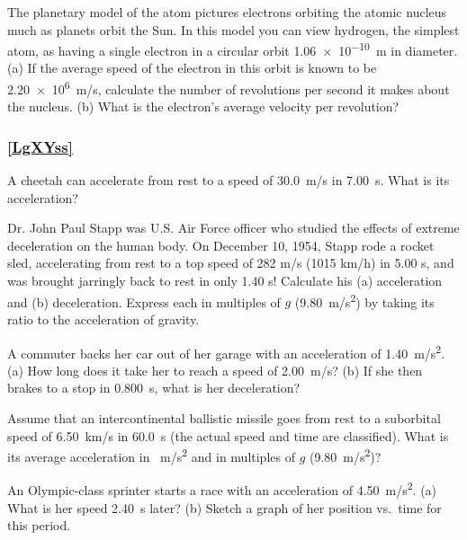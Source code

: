 \documentclass[../../main-ap-physics.tex]{subfiles}
\begin{document}
\begin{exercise}
    The planetary model of the atom pictures electrons orbiting the atomic nucleus much as planets orbit the Sun. In this model you can view hydrogen, the simplest atom, as having a single electron in a circular orbit \SI{1.06e-10}{m} in diameter. (a) If the average speed of the electron in this orbit is known to be \SI{2.20e6}{m/s}, calculate the number of revolutions per second it makes about the nucleus. (b) What is the electron's average velocity per revolution?
\end{exercise}

\subsubsection*{\ref{LgXYss} }

\begin{exercise}
    A cheetah can accelerate from rest to a speed of \SI{30.0}{m/s} in \SI{7.00}{s}. What is its acceleration?
\end{exercise}

\begin{exercise}
Dr. John Paul Stapp was U.S. Air Force officer who studied the effects of extreme deceleration on the human body. On December 10, 1954, Stapp rode a rocket sled, accelerating from rest to a top speed of 282 m/s (1015 km/h) in 5.00 s, and was brought jarringly back to rest in only 1.40 s! Calculate his (a) acceleration and (b) deceleration. Express each in multiples of $g$ (\SI{9.80}{m/s^2}) by taking its ratio to the acceleration of gravity.
\end{exercise}

\begin{exercise}
A commuter backs her car out of her garage with an acceleration of \SI{1.40}{m/s^2}. (a) How long does it take her to reach a speed of \SI{2.00}{m/s}? (b) If she then brakes to a stop in \SI{0.800}{s}, what is her deceleration?
\end{exercise}

\begin{exercise}
Assume that an intercontinental ballistic missile goes from rest to a suborbital speed of \SI{6.50}{km/s} in \SI{60.0}{s} (the actual speed and time are classified). What is its average acceleration in \SI{}{m/s^2} and in multiples of $g$ (\SI{9.80}{m/s^2})?
\end{exercise}

\begin{exercise}
An Olympic-class sprinter starts a race with an acceleration of \SI{4.50}{m/s^2}. (a) What is her speed \SI{2.40}{s} later? (b) Sketch a graph of her position vs.~time for this period.
\end{exercise}
\end{document}
